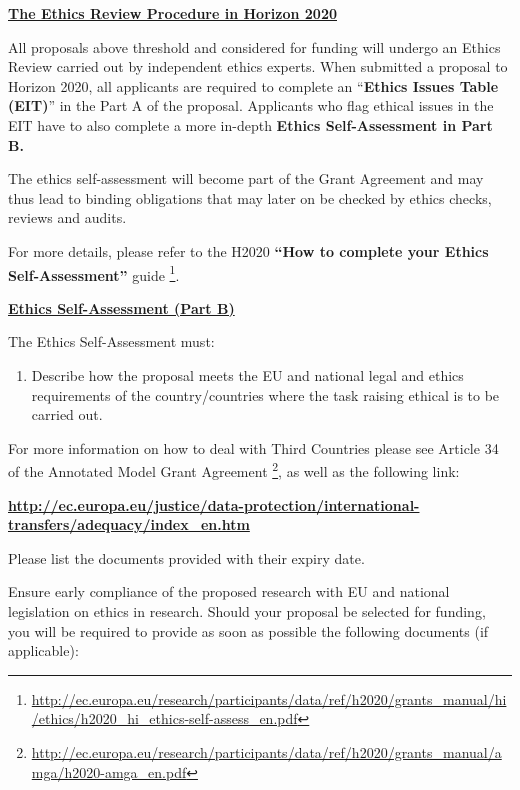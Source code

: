 \bigskip\noindent
{\large {\bf \ul{The Ethics Review Procedure in Horizon 2020}}}

\medskip\noindent
All proposals above threshold and considered for funding will undergo an Ethics Review carried out by independent ethics experts. 
When submitted a proposal to Horizon 2020, all applicants are required to complete an ``{\bf Ethics Issues Table (EIT)}'' in the Part A of the proposal. 
Applicants who flag ethical issues in the EIT have to also complete a more in-depth {\bf Ethics Self-Assessment in Part B.}

\medskip\noindent
The ethics self-assessment will become part of the Grant Agreement and may thus lead to binding obligations that may later on be checked by ethics checks, reviews and audits.

\medskip\noindent
For more details, please refer to the H2020 {\bf ``How to complete your Ethics Self-Assessment''} guide%
\footnote{\url{http://ec.europa.eu/research/participants/data/ref/h2020/grants_manual/hi/ethics/h2020_hi_ethics-self-assess_en.pdf}}.

\bigskip\noindent
\setlength{\fboxsep}{3mm}

\bigskip\noindent
{\large {\bf \ul{Ethics Self-Assessment (Part B)}}}

\medskip\noindent
The Ethics Self-Assessment must:

{\bf
\begin{enumerate}
  \item Describe how the proposal meets the EU and national legal and ethics requirements of the country/countries where the task raising ethical is to be carried out.
\end{enumerate}
}

\medskip\noindent
For more information on how to deal with Third Countries please see Article 34 of the Annotated Model Grant Agreement%
\footnote{\url{http://ec.europa.eu/research/participants/data/ref/h2020/grants_manual/amga/h2020-amga_en.pdf}}, 
as well as the following link: 

\medskip\noindent
{\bf \url{http://ec.europa.eu/justice/data-protection/international-transfers/adequacy/index_en.htm}}

\medskip\noindent
Please list the documents provided with their expiry date.

\medskip\noindent
Ensure early compliance of the proposed research with EU and national legislation on ethics in research.
Should your proposal be selected for funding, 
you will be required to provide as soon as possible the following documents (if applicable): 

